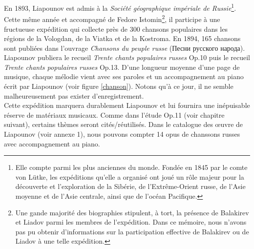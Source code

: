 En 1893, Liapounov est admis à la \emph{Société géographique impériale de Russie}\footnote{Elle compte parmi les plus anciennes du monde. Fondée en 1845 par le comte von Lütke, les expéditions qu'elle a organisé ont joué un rôle majeur pour la découverte et l'exploration de la Sibérie, de l'Extrême-Orient russe, de l'Asie moyenne et de l'Asie centrale, ainsi que de l'océan Pacifique.}. Cette même année et accompagné de Fedore Istomin\footnote{Une gande majorité des biographies stipulent, à tort, la présence de Balakirev et Liadov parmi les membres de l'expédition. Dans ce mémoire, nous n'avons pas pu obtenir d'informations sur la participation effective de Balakirev ou de Liadov à une telle expédition.}, il participe à une fructueuse expédition qui collecte près de 300 chansons populaires dans les régions de la Vologdan, de la Viatka et de la Kostroma. En 1894, 165 chansons sont publiées dans l'ouvrage \emph{Chansons du peuple russe} (\foreignlanguage{russian}{Песни русского народа}). Liapounov publiera le recueil \emph{Trente chants populaires russes} Op.10 puis le recueil \emph{Trente chants populaires russes} Op.13. D'une longueur moyenne d'une page de musique, chaque mélodie vient avec ses paroles et un accompagnement au piano écrit par Liapounov (voir figure \ref{chanson}). Notons qu'à ce jour, il ne semble malheureusement pas exister d'enregistrement.\\

Cette expédition marquera durablement Liapounov et lui fournira une inépuisable réserve de matériaux musicaux. Comme dans l'étude Op.11  (voir chapitre suivant), certains thèmes seront cités/réutilisés. Dans le catalogue des œuvre de Liapounov (voir annexe 1), nous pouvons compter 14 opus de chanssons russes avec accompagnement au piano.


